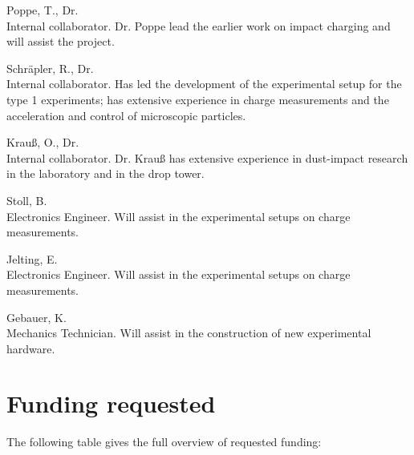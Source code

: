 \begin{teamlist}
\item[Poppe, T., Dr.]\mbox{}\\
Internal collaborator. Dr. Poppe lead the earlier work on impact
charging and will assist the project.

\item[Schr\"apler, R., Dr.]\mbox{}\\
Internal collaborator. Has led the development of the experimental
setup for the type 1 experiments; has extensive experience in
charge measurements and the acceleration and control of
microscopic particles.

\item[Krau{\ss}, O., Dr.]\mbox{}\\
Internal collaborator. Dr. Krau{\ss} has extensive experience in
dust-impact research in the laboratory and in the drop tower.

\item[Stoll, B.]\mbox{}\\
Electronics Engineer. Will assist in the experimental setups on
charge measurements.

\item[Jelting, E.]\mbox{}\\
Electronics Engineer. Will assist in the experimental setups on
charge measurements.

\item[Gebauer, K.]\mbox{}\\
Mechanics Technician. Will assist in the construction of new
experimental hardware.


\end{teamlist}
\vspace{1em}



\section{Funding requested}
The following table gives the full overview of requested
funding:\vspace{1\baselineskip}\\
%
%

